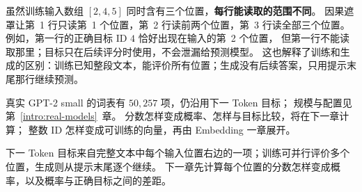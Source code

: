 虽然训练输入数组 $[2,4,5]$ 同时含有三个位置，\textbf{每行能读取的范围不同}。
因果遮罩让第~1 行只读第~1 个位置，第~2 行读前两个位置，第~3 行读全部三个位置。
例如，第一行的正确目标 ID $4$ 恰好出现在输入的第~2 个位置，
但第一行不能读取那里；目标只在后续评分时使用，不会泄漏给预测模型。
这也解释了训练和生成的区别：训练已知整段文本，能评价所有位置；生成没有后续答案，只用提示末尾那行继续预测。

真实 GPT-2 small 的词表有 $50{,}257$ 项，仍沿用下一 Token 目标；
规模与配置见第~\ref*{intro:real-models}~章。
分数怎样变成概率、怎样与目标比较，将在下一章计算；
整数 ID 怎样变成可训练的向量，再由 Embedding 一章展开。



\par\smallskip
下一 Token 目标来自完整文本中每个输入位置右边的一项；训练可并行评价多个位置，生成则从提示末尾逐个继续。
下一章先计算每个位置的分数怎样变成概率，以及概率与正确目标之间的差距。
